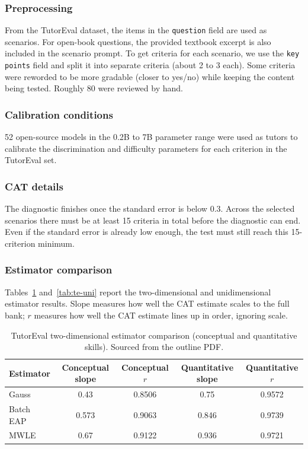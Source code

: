 \subsubsection{Preprocessing}
From the TutorEval dataset, the items in the \texttt{question} field are used as
scenarios. For open-book questions, the provided textbook excerpt is also
included in the scenario prompt. To get criteria for each scenario, we use the
\texttt{key points} field and split it into separate criteria (about 2 to 3
each). Some criteria were reworded to be more gradable (closer to yes/no) while
keeping the content being tested. Roughly 80 were reviewed by hand.

\subsubsection{Calibration conditions}
52 open-source models in the 0.2B to 7B parameter range were used as tutors to
calibrate the discrimination and difficulty parameters for each criterion in the
TutorEval set.

\subsubsection{CAT details}
The diagnostic finishes once the standard error is below $0.3$. Across the
selected scenarios there must be at least 15 criteria in total before the
diagnostic can end. Even if the standard error is already low enough, the test
must still reach this 15-criterion minimum.

\subsubsection{Estimator comparison}
Tables~\ref{tab:te-2d} and~\ref{tab:te-uni} report the two-dimensional and
unidimensional estimator results. Slope measures how well the CAT estimate scales
to the full bank; $r$ measures how well the CAT estimate lines up in order,
ignoring scale.

\begin{table}[t]
  \centering
  \caption{TutorEval two-dimensional estimator comparison (conceptual and
    quantitative skills). Sourced from the outline PDF.}
  \label{tab:te-2d}
  \begin{tabular}{lcccc}
    \toprule
    Estimator & Conceptual slope & Conceptual $r$ & Quantitative slope & Quantitative $r$ \\
    \midrule
    Gauss     & 0.43  & 0.8506 & 0.75  & 0.9572 \\
    Batch EAP & 0.573 & 0.9063 & 0.846 & 0.9739 \\
    MWLE      & 0.67  & 0.9122 & 0.936 & 0.9721 \\
    \bottomrule
  \end{tabular}
\end{table}

